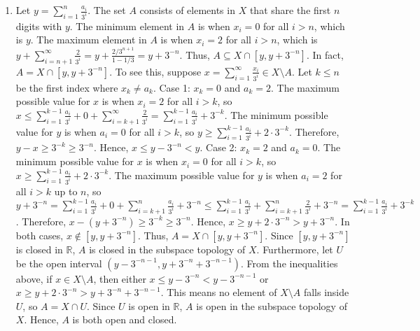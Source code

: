 \documentclass{article}
\begin{document}
\begin{enumerate}[label=\fbox{\arabic*}]
  \item %
        Let $y = \sum_{i=1}^n \frac{a_i}{3^i}$. The set $A$ consists of elements in $X$ that share the first $n$ digits with $y$.
        The minimum element in $A$ is when $x_i = 0$ for all $i > n$, which is $y$.
        The maximum element in $A$ is when $x_i = 2$ for all $i > n$, which is $y + \sum_{i=n+1}^\infty \frac{2}{3^i} = y + \frac{2/3^{n+1}}{1 - 1/3} = y + 3^{-n}$.
        Thus, $A \subseteq X \cap [y, y + 3^{-n}]$. In fact, $A = X \cap [y, y + 3^{-n}]$.
        To see this, suppose $x = \sum_{i=1}^\infty \frac{x_i}{3^i} \in X \setminus A$. Let $k \le n$ be the first index where $x_k \neq a_k$.
        Case 1: $x_k = 0$ and $a_k = 2$.
        The maximum possible value for $x$ is when $x_i = 2$ for all $i > k$, so $x \le \sum_{i=1}^{k-1} \frac{a_i}{3^i} + 0 + \sum_{i=k+1}^\infty \frac{2}{3^i} = \sum_{i=1}^{k-1} \frac{a_i}{3^i} + 3^{-k}$.
        The minimum possible value for $y$ is when $a_i = 0$ for all $i > k$, so $y \ge \sum_{i=1}^{k-1} \frac{a_i}{3^i} + 2 \cdot 3^{-k}$.
        Therefore, $y - x \ge 3^{-k} \ge 3^{-n}$. Hence, $x \le y - 3^{-n} < y$.
        Case 2: $x_k = 2$ and $a_k = 0$.
        The minimum possible value for $x$ is when $x_i = 0$ for all $i > k$, so $x \ge \sum_{i=1}^{k-1} \frac{a_i}{3^i} + 2 \cdot 3^{-k}$.
        The maximum possible value for $y$ is when $a_i = 2$ for all $i > k$ up to $n$, so $y + 3^{-n} = \sum_{i=1}^{k-1} \frac{a_i}{3^i} + 0 + \sum_{i=k+1}^n \frac{a_i}{3^i} + 3^{-n} \le \sum_{i=1}^{k-1} \frac{a_i}{3^i} + \sum_{i=k+1}^n \frac{2}{3^i} + 3^{-n} = \sum_{i=1}^{k-1} \frac{a_i}{3^i} + 3^{-k}$.
        Therefore, $x - (y + 3^{-n}) \ge 3^{-k} \ge 3^{-n}$. Hence, $x \ge y + 2 \cdot 3^{-n} > y + 3^{-n}$.
        In both cases, $x \notin [y, y + 3^{-n}]$. Thus, $A = X \cap [y, y + 3^{-n}]$.
        Since $[y, y + 3^{-n}]$ is closed in $\mathbb{R}$, $A$ is closed in the subspace topology of $X$.
        Furthermore, let $U$ be the open interval $(y - 3^{-n-1}, y + 3^{-n} + 3^{-n-1})$.
        From the inequalities above, if $x \in X \setminus A$, then either $x \le y - 3^{-n} < y - 3^{-n-1}$ or $x \ge y + 2 \cdot 3^{-n} > y + 3^{-n} + 3^{-n-1}$.
        This means no element of $X \setminus A$ falls inside $U$, so $A = X \cap U$.
        Since $U$ is open in $\mathbb{R}$, $A$ is open in the subspace topology of $X$.
        Hence, $A$ is both open and closed.

\end{enumerate}
\end{document}
